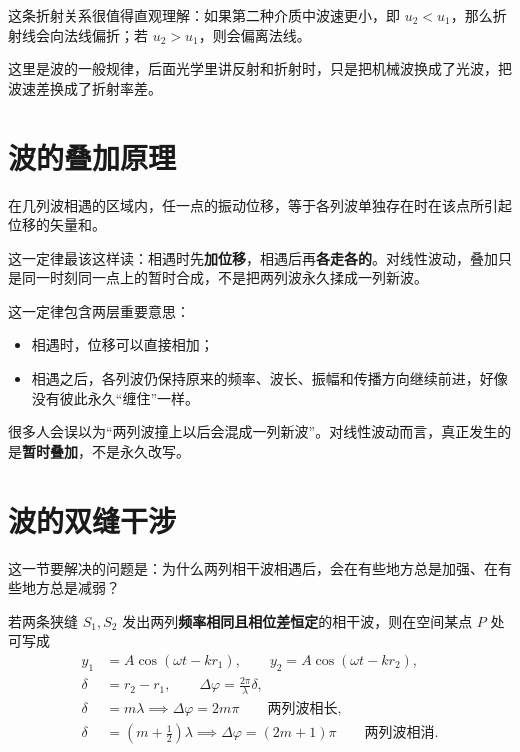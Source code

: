\documentclass[lang=cn,11pt]{elegantbook}
\newcommand{\bridge}[1]{\begin{note}#1\end{note}}
\begin{document}
这条折射关系很值得直观理解：如果第二种介质中波速更小，即 \(u_2<u_1\)，那么折射线会向法线偏折；若 \(u_2>u_1\)，则会偏离法线。

\begin{note}
这里是波的一般规律，后面光学里讲反射和折射时，只是把机械波换成了光波，把波速差换成了折射率差。
\end{note}

\section{波的叠加原理}

\begin{definition}[波的叠加原理]
在几列波相遇的区域内，任一点的振动位移，等于各列波单独存在时在该点所引起位移的矢量和。
\end{definition}

\bridge{这一定律最该这样读：相遇时先\textbf{加位移}，相遇后再\textbf{各走各的}。对线性波动，叠加只是同一时刻同一点上的暂时合成，不是把两列波永久揉成一列新波。}

这一定律包含两层重要意思：
\begin{itemize}
  \item 相遇时，位移可以直接相加；
  \item 相遇之后，各列波仍保持原来的频率、波长、振幅和传播方向继续前进，好像没有彼此永久“缠住”一样。
\end{itemize}

\begin{remark}
很多人会误以为“两列波撞上以后会混成一列新波”。对线性波动而言，真正发生的是\textbf{暂时叠加}，不是永久改写。
\end{remark}

\section{波的双缝干涉}

这一节要解决的问题是：为什么两列相干波相遇后，会在有些地方总是加强、在有些地方总是减弱？

若两条狭缝 \(S_1,S_2\) 发出两列\textbf{频率相同且相位差恒定}的相干波，则在空间某点 \(P\) 处可写成
\[
\begin{aligned}
y_1&=A\cos(\omega t-kr_1),\qquad
y_2=A\cos(\omega t-kr_2),\\
\delta&=r_2-r_1,\qquad
\Delta\varphi=\frac{2\pi}{\lambda}\delta,\\
\delta&=m\lambda
\implies \Delta\varphi=2m\pi \qquad \text{两列波相长},\\
\delta&=\left(m+\frac12\right)\lambda
\implies \Delta\varphi=(2m+1)\pi \qquad \text{两列波相消}.
\end{aligned}
\]
\end{document}
